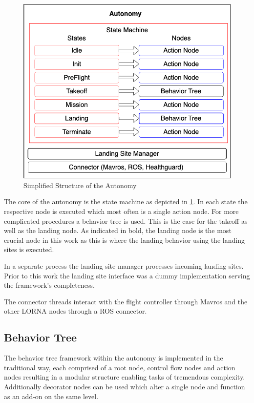 \begin{figure}[ht!]
    \centering
    \includegraphics[scale=0.45]{images/setup/autonomy.png}
    \caption{Simplified Structure of the Autonomy}
    \label{fig:autonomy}
\end{figure}

The core of the autonomy is the state machine as depicted in \cref{fig:autonomy}. In each state the respective node is executed which most often is a single action node. For more complicated procedures a behavior tree is used. This is the case for the takeoff as well as the landing node. As indicated in bold, the landing node is the most crucial node in this work as this is where the landing behavior using the landing sites is executed.

In a separate process the landing site manager processes incoming landing sites. Prior to this work the landing site interface was a dummy implementation serving the framework's completeness.

The connector threads interact with the flight controller through Mavros and the other LORNA nodes through a ROS connector.

\subsection{Behavior Tree}

The behavior tree framework within the autonomy is implemented in the traditional way, each comprised of a root node, control flow nodes and action nodes resulting in a modular structure enabling tasks of tremendous complexity. Additionally decorator nodes can be used which alter a single node and function as an add-on on the same level.

